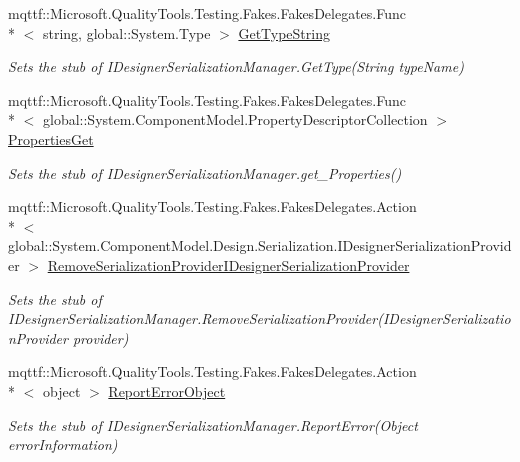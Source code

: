 \begin{DoxyCompactItemize}
mqttf\-::\-Microsoft.\-Quality\-Tools.\-Testing.\-Fakes.\-Fakes\-Delegates.\-Func\\*
$<$ string, global\-::\-System.\-Type $>$ \hyperlink{class_system_1_1_component_model_1_1_design_1_1_serialization_1_1_fakes_1_1_stub_i_designer_serialization_manager_a3dc15092c45178af6d8335899b922515}{Get\-Type\-String}
\begin{DoxyCompactList}\small\item\em Sets the stub of I\-Designer\-Serialization\-Manager.\-Get\-Type(\-String type\-Name)\end{DoxyCompactList}\item 
mqttf\-::\-Microsoft.\-Quality\-Tools.\-Testing.\-Fakes.\-Fakes\-Delegates.\-Func\\*
$<$ global\-::\-System.\-Component\-Model.\-Property\-Descriptor\-Collection $>$ \hyperlink{class_system_1_1_component_model_1_1_design_1_1_serialization_1_1_fakes_1_1_stub_i_designer_serialization_manager_aac566d73bd7e66d8cda39f51119ee71b}{Properties\-Get}
\begin{DoxyCompactList}\small\item\em Sets the stub of I\-Designer\-Serialization\-Manager.\-get\-\_\-\-Properties()\end{DoxyCompactList}\item 
mqttf\-::\-Microsoft.\-Quality\-Tools.\-Testing.\-Fakes.\-Fakes\-Delegates.\-Action\\*
$<$ global\-::\-System.\-Component\-Model.\-Design.\-Serialization.\-I\-Designer\-Serialization\-Provider $>$ \hyperlink{class_system_1_1_component_model_1_1_design_1_1_serialization_1_1_fakes_1_1_stub_i_designer_serialization_manager_a2ec0c367a787f39a879e0584fd7cca60}{Remove\-Serialization\-Provider\-I\-Designer\-Serialization\-Provider}
\begin{DoxyCompactList}\small\item\em Sets the stub of I\-Designer\-Serialization\-Manager.\-Remove\-Serialization\-Provider(\-I\-Designer\-Serialization\-Provider provider)\end{DoxyCompactList}\item 
mqttf\-::\-Microsoft.\-Quality\-Tools.\-Testing.\-Fakes.\-Fakes\-Delegates.\-Action\\*
$<$ object $>$ \hyperlink{class_system_1_1_component_model_1_1_design_1_1_serialization_1_1_fakes_1_1_stub_i_designer_serialization_manager_a5d92add025bc914d1050f0502dc64d51}{Report\-Error\-Object}
\begin{DoxyCompactList}\small\item\em Sets the stub of I\-Designer\-Serialization\-Manager.\-Report\-Error(\-Object error\-Information)\end{DoxyCompactList}\item 

\end{DoxyCompactItemize}
